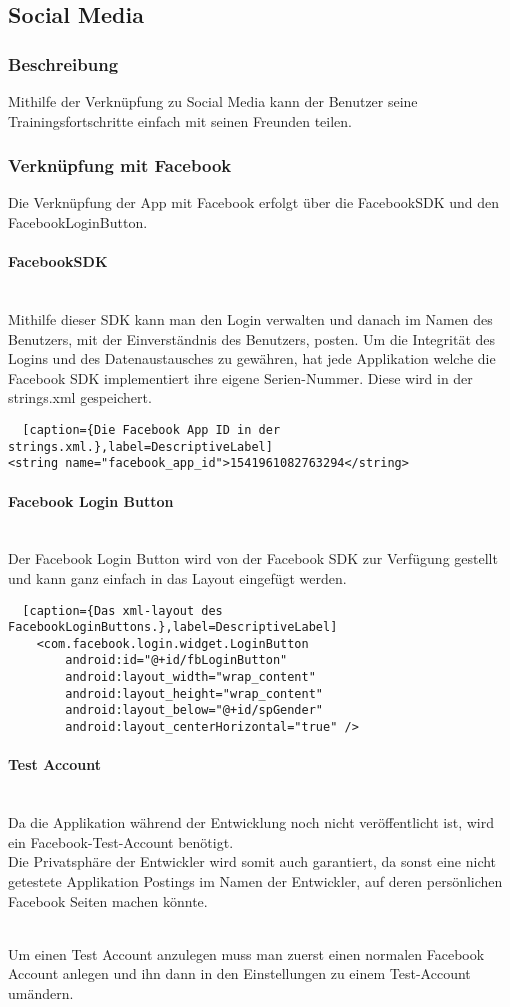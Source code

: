 \documentclass[FIPLY_base.tex]{subfiles}
\begin{document}
\subsection{Social Media}
\subsubsection{Beschreibung}
Mithilfe der Verknüpfung zu Social Media kann der Benutzer seine Trainingsfortschritte einfach mit seinen Freunden teilen. 
\subsubsection{Verknüpfung mit Facebook}
Die Verknüpfung der App mit Facebook erfolgt über die FacebookSDK und den FacebookLoginButton.
\paragraph{FacebookSDK}\ \\
Mithilfe dieser SDK kann man den Login verwalten und danach im Namen des Benutzers, mit der Einverständnis des Benutzers, posten.
Um die Integrität des Logins und des Datenaustausches zu gewähren, hat jede Applikation welche die Facebook SDK implementiert ihre eigene Serien-Nummer.
Diese wird in der strings.xml gespeichert.
\begin{lstlisting}  [caption={Die Facebook App ID in der strings.xml.},label=DescriptiveLabel]
<string name="facebook_app_id">1541961082763294</string>
\end{lstlisting}
\paragraph{Facebook Login Button}\ \\
Der Facebook Login Button wird von der Facebook SDK zur Verfügung gestellt und kann ganz einfach in das Layout eingefügt werden.
\begin{lstlisting}  [caption={Das xml-layout des FacebookLoginButtons.},label=DescriptiveLabel]
    <com.facebook.login.widget.LoginButton
        android:id="@+id/fbLoginButton"
        android:layout_width="wrap_content"
        android:layout_height="wrap_content"
        android:layout_below="@+id/spGender"
        android:layout_centerHorizontal="true" />
\end{lstlisting}

\newpage
\paragraph{Test Account}\ \\
Da die Applikation während der Entwicklung noch nicht veröffentlicht ist, wird ein Facebook-Test-Account benötigt. \ \\
Die Privatsphäre der Entwickler wird somit auch garantiert, da sonst eine nicht getestete Applikation Postings im Namen der Entwickler, auf deren persönlichen Facebook Seiten machen könnte.

\ \\
Um einen Test Account anzulegen muss man zuerst einen normalen Facebook Account anlegen und ihn dann in den Einstellungen zu einem Test-Account umändern.
\end{document}
